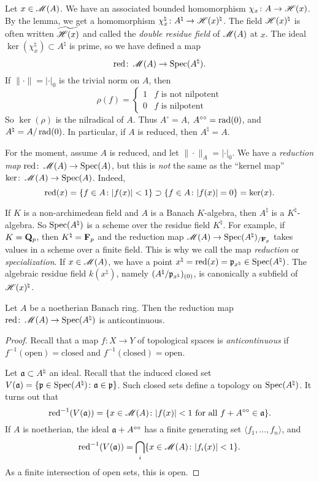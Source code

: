 Let $x\in \operatorname{\mathscr{M}}(A)$. We have an associated bounded homomorphism 
$\chi_x\colon A\to \mathscr{H}(x)$. By the lemma, we get a homomorphism 
$\chi_x^\natural\colon A^\natural\to \mathscr{H}(x)^\natural$. The field 
$\mathscr{H}(x)^\natural$ is often written $\widetilde{\mathscr{H}(x)}$ and called the 
\emph{double residue field} of $\operatorname{\mathscr{M}}(A)$ at $x$. The ideal 
$\ker(\chi_x^\natural)\subset A^\natural$ is prime, so we have defined a map 
\[
	\operatorname{red}\colon \operatorname{\mathscr{M}}(A)\to \operatorname{Spec}(A^\natural) .
\]
If $\|\cdot\|=|\cdot|_0$ is the trivial norm on $A$, then 
\[
	\rho(f) = \begin{cases} 1 & f\text{ is not nilpotent} \\ 0 & f\text{ is nilpotent} \end{cases} 
\]
So $\ker(\rho)$ is the nilradical of $A$. Thus $A^\circ=A$, 
$A^{\circ\circ}=\operatorname{rad}(0)$, and $A^\natural=A/\operatorname{rad}(0)$. In particular, if $A$ is 
reduced, then $A^\natural=A$. 

For the moment, assume $A$ is reduced, and let $\|\cdot\|_A=|\cdot|_0$. We have 
a \emph{reduction map} $\operatorname{red}\colon \operatorname{\mathscr{M}}(A)\to \operatorname{Spec}(A)$, but this is 
\emph{not} the same as the ``kernel map'' 
$\ker\colon \operatorname{\mathscr{M}}(A)\to \operatorname{Spec}(A)$. Indeed, 
\[
	\operatorname{red}(x) = \{f\in A\colon |f(x)|<1\} \supset \{f\in A\colon |f(x)|=0\} = \ker(x) .
\]

If $K$ is a non-archimedean field and $A$ is a Banach $K$-algebra, then 
$A^\natural$ is a $K^\natural$-algebra. So $\operatorname{Spec}(A^\natural)$ is a scheme over 
the residue field $K^\natural$. For example, if $K=\mathbf{Q}_p$, then 
$K^\natural=\mathbf{F}_p$ and the reduction map 
$\operatorname{\mathscr{M}}(A)\to \operatorname{Spec}(A^\natural)_{/\mathbf{F}_p}$ takes values in a scheme over a 
finite field. This is why we call the map \emph{reduction} or 
\emph{specialization}. If $x\in \operatorname{\mathscr{M}}(A)$, we have a point 
$x^\natural=\operatorname{red}(x)=\mathfrak{p}_{x^\natural}\in \operatorname{Spec}(A^\natural)$. The algebraic 
residue field $k(x^\natural)$, namely $(A^\natural/\mathfrak{p}_{x^\natural})_{(0)}$, is 
canonically a subfield of $\mathscr{H}(x)^\natural$. 

\begin{theorem}
Let $A$ be a noetherian Banach ring. Then the reduction map 
$\operatorname{red}\colon \operatorname{\mathscr{M}}(A)\to \operatorname{Spec}(A^\natural)$ is anticontinuous.
\end{theorem}
\begin{proof}
Recall that a map $f\colon X\to Y$ of topological spaces is 
\emph{anticontinuous} if $f^{-1}(\text{open})=\text{closed}$ and 
$f^{-1}(\text{closed})=\text{open}$. 

Let $\mathfrak{a}\subset A^\natural$ an ideal. Recall that the 
induced closed set $V(\mathfrak{a})=\{\mathfrak{p}\in \operatorname{Spec}(A^\natural)\colon \mathfrak{a}\in \mathfrak{p}\}$. Such 
closed sets define a topology on $\operatorname{Spec}(A^\natural)$. It turns out that 
\[
	\operatorname{red}^{-1}(V(\mathfrak{a})) = \{x\in \operatorname{\mathscr{M}}(A)\colon |f(x)|<1\text{ for all }f+A^{\circ\circ}\in \mathfrak{a}\} .
\]
If $A$ is noetherian, the ideal $\mathfrak{a}+A^{\circ\circ}$ has a finite generating 
set $\langle f_1,\dots,f_n\rangle$, and 
\[
	\operatorname{red}^{-1}(V(\mathfrak{a})) = \bigcap_i \{x\in \operatorname{\mathscr{M}}(A)\colon |f_i(x)|<1\} .
\]
As a finite intersection of open sets, this is open. 
\end{proof}

